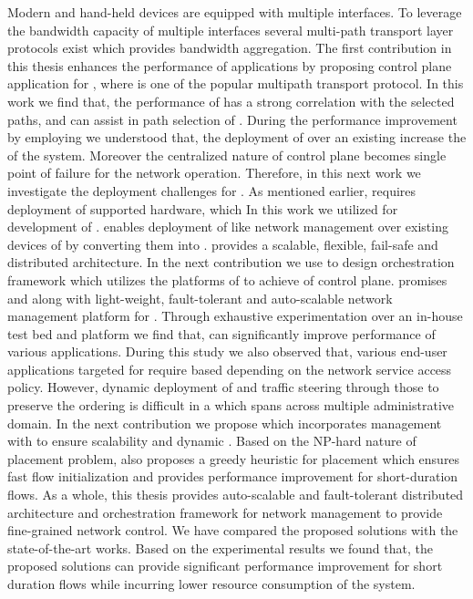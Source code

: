 Modern  and hand-held devices are equipped with multiple interfaces. To leverage the bandwidth capacity of multiple interfaces several multi-path transport layer protocols exist which provides bandwidth aggregation. The first contribution in this thesis enhances the performance of  applications by proposing  control plane application  for , where  is one of the popular multipath transport protocol. In this work we find that, the performance of  has a strong correlation with the selected paths, and  can assist in path selection of . During the performance improvement by employing  we understood that, the deployment of  over an existing  increase the  of the system. Moreover the centralized nature of  control plane becomes single point of failure for the network operation. Therefore, in this next work we investigate the  deployment challenges for . As mentioned earlier,  requires deployment of  supported hardware, which In this work we utilized  for development of .  enables deployment of  like network management over existing  devices of  by converting them into .  provides a scalable, flexible, fail-safe and distributed  architecture. In the next contribution we use  to design  orchestration framework which utilizes the  platforms of  to achieve  of  control plane.  promises  and  along with light-weight, fault-tolerant and auto-scalable network management platform for . Through exhaustive experimentation over an in-house test bed and  platform we find that,  can significantly improve performance of various  applications. During this study we also observed that, various end-user applications targeted for  require  based  depending on the network service access policy. However, dynamic deployment of  and traffic steering through those  to preserve the  ordering is difficult in a  which spans across multiple administrative domain. In the next contribution we propose  which incorporates  management with  to ensure scalability and dynamic . Based on the NP-hard nature of  placement problem,  also proposes a greedy heuristic for  placement which ensures fast flow initialization and provides performance improvement for short-duration flows. As a whole, this thesis provides auto-scalable and fault-tolerant distributed architecture and orchestration framework for  network management to provide fine-grained network control. We have compared the proposed solutions with the state-of-the-art works. Based on the experimental results we found that, the proposed solutions can provide significant performance improvement for short duration flows while incurring lower resource consumption of the system.